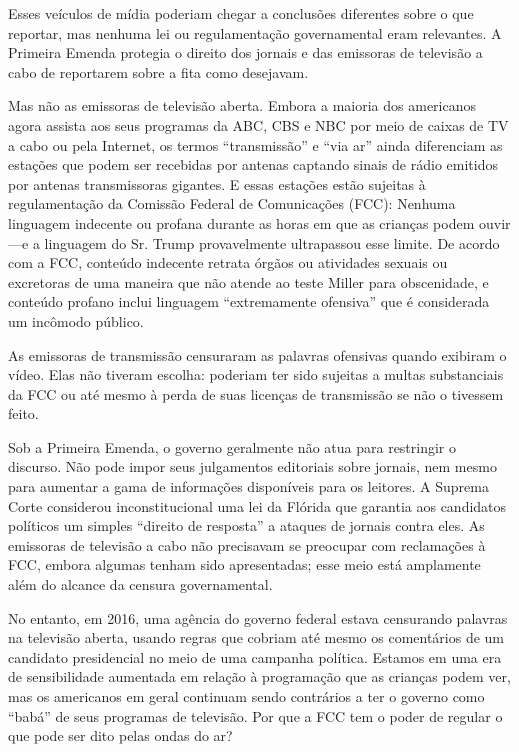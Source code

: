 \documentclass{book}
\begin{document}
Esses veículos de mídia poderiam chegar a conclusões diferentes sobre o que
reportar, mas nenhuma lei ou regulamentação governamental eram relevantes.
A Primeira Emenda protegia o direito dos jornais e das emissoras de televisão a
cabo de reportarem sobre a fita como desejavam.

Mas não as emissoras de televisão aberta. Embora a maioria dos americanos agora
assista aos seus programas da ABC, CBS e NBC por meio de caixas de TV a cabo ou
pela Internet, os termos ``transmissão'' e ``via ar'' ainda diferenciam as estações
que podem ser recebidas por antenas captando sinais de rádio emitidos por antenas
transmissoras gigantes. E essas estações estão sujeitas à regulamentação da
Comissão Federal de Comunicações (FCC): Nenhuma linguagem indecente ou profana
durante as horas em que as crianças podem ouvir---e a linguagem do Sr. Trump
provavelmente ultrapassou esse limite. De acordo com a FCC, conteúdo indecente
retrata órgãos ou atividades sexuais ou excretoras de uma maneira que não atende
ao teste Miller para obscenidade, e conteúdo profano inclui linguagem ``extremamente
ofensiva'' que é considerada um incômodo público.

As emissoras de transmissão censuraram as palavras ofensivas quando exibiram o
vídeo. Elas não tiveram escolha: poderiam ter sido sujeitas a multas substanciais
da FCC ou até mesmo à perda de suas licenças de transmissão se não o tivessem
feito.

Sob a Primeira Emenda, o governo geralmente não atua para restringir o discurso.
Não pode impor seus julgamentos editoriais sobre jornais, nem mesmo para aumentar
a gama de informações disponíveis para os leitores. A Suprema Corte considerou
inconstitucional uma lei da Flórida que garantia aos candidatos políticos um
simples ``direito de resposta'' a ataques de jornais contra eles. As emissoras de
televisão a cabo não precisavam se preocupar com reclamações à FCC, embora algumas
tenham sido apresentadas; esse meio está amplamente além do alcance da censura
governamental.

No entanto, em 2016, uma agência do governo federal estava censurando palavras
na televisão aberta, usando regras que cobriam até mesmo os comentários de um
candidato presidencial no meio de uma campanha política. Estamos em uma era de
sensibilidade aumentada em relação à programação que as crianças podem ver, mas
os americanos em geral continuam sendo contrários a ter o governo como ``babá''
de seus programas de televisão. Por que a FCC tem o poder de regular o que pode
ser dito pelas ondas do ar?
\end{document}
